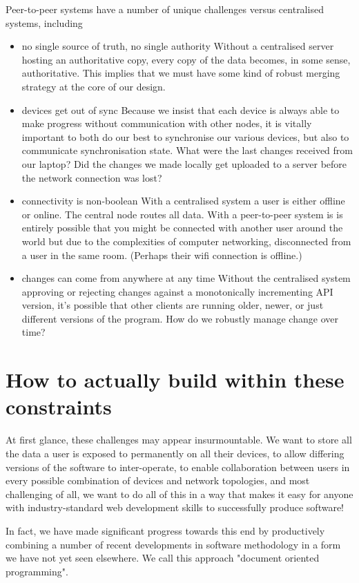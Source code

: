 \documentclass[sigplan,10pt]{acmart}
\begin{document}
\begin{itemize}
Peer-to-peer systems have a number of unique challenges versus centralised systems, including
    \begin{itemize}
	    \item no single source of truth, no single authority
	    Without a centralised server hosting an authoritative copy, every copy of the data becomes, in some sense, authoritative. This implies that we must have some kind of robust merging strategy at the core of our design.
	    \item devices get out of sync
	    Because we insist that each device is always able to make progress without communication with other nodes, it is vitally important to both do our best to synchronise our various devices, but also to communicate synchronisation state. What were the last changes received from our laptop? Did the changes we made locally get uploaded to a server before the network connection was lost?  
	    \item connectivity is non-boolean
	    With a centralised system a user is either offline or online. The central node routes all data. With a peer-to-peer system is is entirely possible that you might be connected with another user around the world but due to the complexities of computer networking, disconnected from a user in the same room. (Perhaps their wifi connection is offline.) 
	    \item changes can come from anywhere at any time
	    Without the centralised system approving or rejecting changes against a monotonically incrementing API version, it's possible that other clients are running older, newer, or just different versions of the program. How do we robustly manage change over time?
    \end{itemize}

\section{How to actually build within these constraints}
At first glance, these challenges may appear insurmountable. We want to store all the data a user is exposed to permanently on all their devices, to allow differing versions of the software to inter-operate, to enable collaboration between users in every possible combination of devices and network topologies, and most challenging of all, we want to do all of this in a way that makes it easy for anyone with industry-standard web development skills to successfully produce software!

In fact, we have made significant progress towards this end by productively combining a number of recent developments in software methodology in a form we have not yet seen elsewhere. We call this approach "document oriented programming".


\end{itemize}
\end{document}
